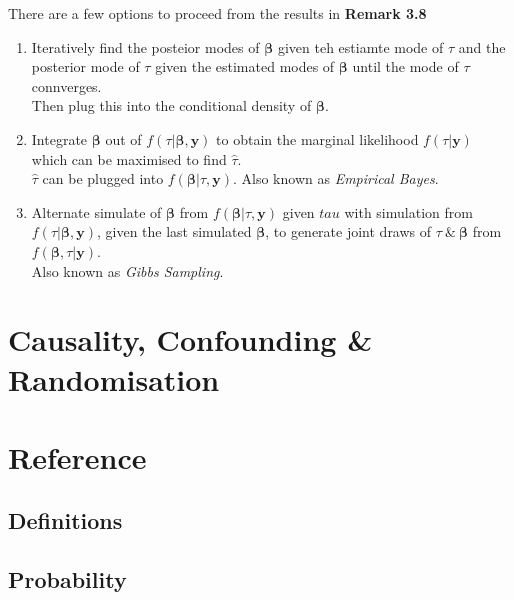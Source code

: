 \documentclass[11pt,a4paper]{article}
\begin{document}
There are a few options to proceed from the results in \textbf{Remark 3.8}
\begin{enumerate}
	\item Iteratively find the posteior modes of $\pmb\beta$ given teh estiamte mode of $\tau$ and the posterior mode of $\tau$ given the estimated modes of $\pmb\beta$ until the mode of $\tau$ connverges.\\
	Then plug this into the conditional density of $\pmb\beta$.
	\item Integrate $\pmb\beta$ out of $f(\tau|\pmb\beta,\textbf{y})$ to obtain the marginal likelihood $f(\tau|\textbf{y})$ which can be maximised to find $\hat\tau$.\\
	$\hat\tau$ can be plugged into $f(\pmb\beta|\tau,\textbf{y})$.
	\nb Also known as \textit{Empirical Bayes}.
	\item Alternate simulate of $\pmb\beta$ from $f(\pmb\beta|\tau,\textbf{y})$ given $tau$ with simulation from $f(\tau|\pmb\beta,\textbf{y})$, given the last simulated $\pmb\beta$, to generate joint draws of $\tau\ \&\ \pmb\beta$ from $f(\pmb\beta,\tau|\textbf{y})$.\\
	\nb Also known as \textit{Gibbs Sampling}.
\end{enumerate}

\section{Causality, Confounding \& Randomisation}

\newpage
\setcounter{section}{-1}
\section{Reference}

\subsection{Definitions}







\subsection{Probability}
\end{document}
